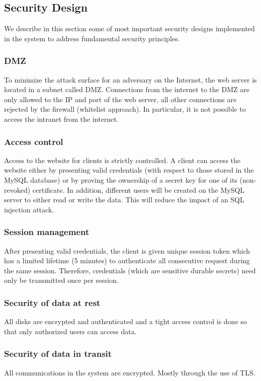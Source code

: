 \documentclass[english]{article}
\begin{document}
\subsection{Security Design}\label{ssec:security_design}
We describe in this section some of most important security designs implemented in the system to address fundamental security principles. 
\subsubsection{DMZ}
To minimize the attack surface for an adversary on the Internet, the web server is located in a subnet called DMZ. Connections from the internet to the DMZ are only allowed to the IP and port of the web server, all other connections are rejected by the firewall (whitelist approach). In particular, it is not possible to access the intranet from the internet.
\subsubsection{Access control}
Access to the website for clients is strictly controlled. A client can access the website either by presenting valid credentials (with respect to those stored in the MySQL database) or by proving the ownership of a secret key for one of its (non-revoked) certificate. In addition, different users will be created on the MySQL server to either read or write the data. This will reduce the impact of an SQL injection attack.
\subsubsection{Session management}
After presenting valid credentials, the client is given unique session token which has a limited lifetime (5 minutes) to authenticate all consecutive request during the same session. Therefore, credentials (which are sensitive durable secrets) need only be transmitted once per session.
\subsubsection{Security of data at rest}
All disks are encrypted and authenticated and a tight access control is done so that only authorized users can access data.
\subsubsection{Security of data in transit}
All communications in the system are encrypted. Mostly through the use of TLS.
\end{document}
